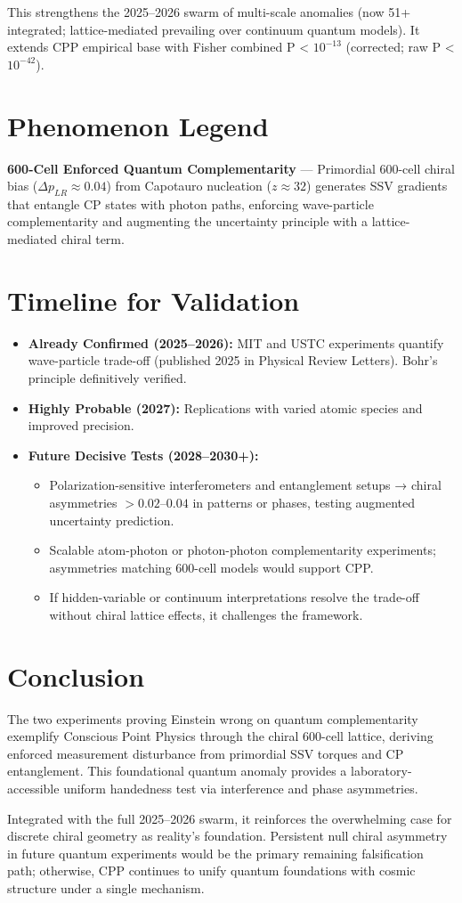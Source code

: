 \documentclass[11pt]{article}
\begin{document}
This strengthens the 2025--2026 swarm of multi-scale anomalies (now 51+ integrated; lattice-mediated prevailing over continuum quantum models). It extends CPP empirical base with Fisher combined P < $10^{-13}$ (corrected; raw P < $10^{-42}$).

\section{Phenomenon Legend}
\textbf{600-Cell Enforced Quantum Complementarity} — Primordial 600-cell chiral bias ($\Delta p_{LR} \approx 0.04$) from Capotauro nucleation ($z \approx 32$) generates SSV gradients that entangle CP states with photon paths, enforcing wave-particle complementarity and augmenting the uncertainty principle with a lattice-mediated chiral term.

\section{Timeline for Validation}
\begin{itemize}
    \item \textbf{Already Confirmed (2025--2026):} MIT and USTC experiments quantify wave-particle trade-off (published 2025 in Physical Review Letters). Bohr's principle definitively verified.
    \item \textbf{Highly Probable (2027):} Replications with varied atomic species and improved precision.
    \item \textbf{Future Decisive Tests (2028--2030+):}
    \begin{itemize}
        \item Polarization-sensitive interferometers and entanglement setups → chiral asymmetries $>0.02$--$0.04$ in patterns or phases, testing augmented uncertainty prediction.
        \item Scalable atom-photon or photon-photon complementarity experiments; asymmetries matching 600-cell models would support CPP.
        \item If hidden-variable or continuum interpretations resolve the trade-off without chiral lattice effects, it challenges the framework.
    \end{itemize}
\end{itemize}

\section{Conclusion}
The two experiments proving Einstein wrong on quantum complementarity exemplify Conscious Point Physics through the chiral 600-cell lattice, deriving enforced measurement disturbance from primordial SSV torques and CP entanglement. This foundational quantum anomaly provides a laboratory-accessible uniform handedness test via interference and phase asymmetries.  

Integrated with the full 2025--2026 swarm, it reinforces the overwhelming case for discrete chiral geometry as reality's foundation. Persistent null chiral asymmetry in future quantum experiments would be the primary remaining falsification path; otherwise, CPP continues to unify quantum foundations with cosmic structure under a single mechanism.
\end{document}
